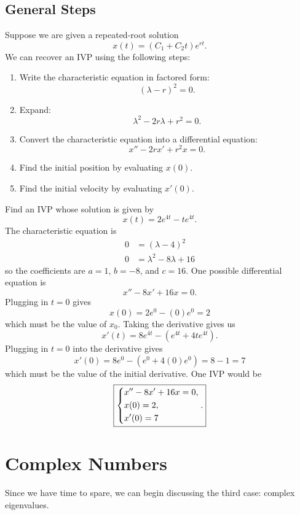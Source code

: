 \documentclass[10pt,letterpaper]{article}
\begin{document}
\subsection{General Steps}

Suppose we are given a repeated-root solution
\[
x(t)=(C_1+C_2t)e^{r t}.
\]
We can recover an IVP using the following steps:
\begin{enumerate}
    \item Write the characteristic equation in factored form:
    \[
    (\lambda-r)^2=0.
    \]

    \item Expand:
    \[
    \lambda^2-2r\lambda+r^2=0.
    \]

    \item Convert the characteristic equation into a differential equation:
    \[
    x''-2rx'+r^2x=0.
    \]

    \item Find the initial position by evaluating $x(0)$.

    \item Find the initial velocity by evaluating $x'(0)$.
\end{enumerate}

\begin{example}[3]
{
Find an IVP whose solution is given by $$x(t)=2e^{4t}-te^{4t}.$$
}
The characteristic equation is 
\begin{align*}
    0 &= (\lambda-4)^2\\
    0 &= \lambda^2 -8\lambda + 16
\end{align*}
so the coefficients are $a=1$, $b=-8$, and $c=16$. One possible differential equation is
$$
x'' -8x' +16x=0.
$$
Plugging in $t=0$ gives 
$$
x(0) = 2e^{0}-(0)e^{0}=2
$$
which must be the value of $x_0$. Taking the derivative gives us 
$$
x'(t) = 8e^{4t} -(e^{4t}+4te^{4t}).
$$
Plugging in $t=0$ into the derivative gives 
$$
x'(0) = 8e^{0} -(e^{0}+4(0)e^{0}) = 8-1=7
$$
which must be the value of the initial derivative. One IVP would be  
$$
\boxed{
\begin{dcases}
x''-8x'+ 16x=0, \\
x(0) = 2,\\
x'(0)=7
\end{dcases}.
}
$$
\end{example}

\section{Complex Numbers}
Since we have time to spare, we can begin discussing the third case: complex eigenvalues.
\end{document}
